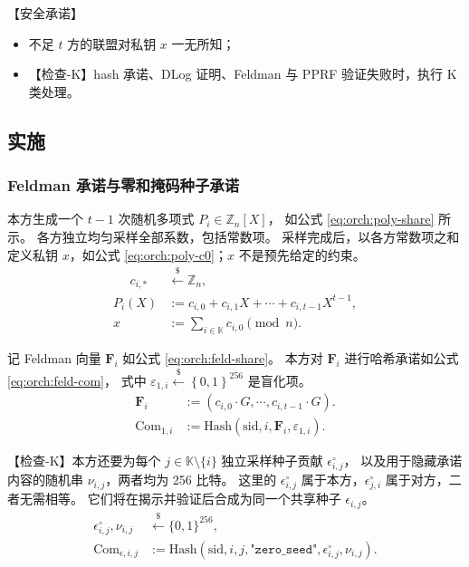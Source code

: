 【安全承诺】

\begin{itemize}
\item
  不足 $t$ 方的联盟对私钥 $x$ 一无所知；
\item
  【检查-K】hash 承诺、DLog 证明、Feldman 与 PPRF 验证失败时，执行 K 类处理。
\end{itemize}

\subsection{实施}

\subsubsection{Feldman 承诺与零和掩码种子承诺}
\label{sec:orchestration:round1}

本方生成一个 $t-1$ 次随机多项式 $P_i \in \mathbb{Z}_n[X]$，
如公式 \eqref{eq:orch:poly-share} 所示。
各方独立均匀采样全部系数，包括常数项。
采样完成后，以各方常数项之和定义私钥 $x$，如公式 \eqref{eq:orch:poly-c0}；$x$ 不是预先给定的约束。
\begin{align}
\tag{coeff}
\phantom{{}={}} c_{i,*} & \stackrel{\$}{\leftarrow} \mathbb{Z}_n, \\
\label{eq:orch:poly-share}\tag{PiX}
P_i(X) &:= c_{i,0} + c_{i,1}X + \cdots + c_{i,t-1}X^{t-1}, \\
\label{eq:orch:poly-c0}\tag{c0}
x &:= \sum_{i\in\mathbb{K}} c_{i,0} \pmod n.
\end{align}

记 Feldman 向量 $\mathbf{F}_i$ 如公式 \eqref{eq:orch:feld-share}。
本方对 $\mathbf{F}_i$ 进行哈希承诺如公式 \eqref{eq:orch:feld-com}，
式中 $\varepsilon_{1,i} \stackrel{\$}{\leftarrow} \left\{0,1\right\}^{256}$ 是盲化项。
\begin{align}
\label{eq:orch:feld-share}\tag{Fi}
\mathbf{F}_i
&:= (c_{i,0} \cdot G, \cdots, c_{i,t-1}\cdot G). \\
\label{eq:orch:feld-com}\tag{Com1}
\mathrm{Com}_{1,i}
&:= \mathrm{Hash}\left(
  \mathrm{sid}, i, \mathbf{F}_i, \varepsilon_{1,i}
\right).
\end{align}

【检查-K】本方还要为每个 $j\in\mathbb{K}\setminus\{i\}$ 独立采样种子贡献 $\epsilon^\circ_{i,j}$，
以及用于隐藏承诺内容的随机串 $\nu_{i,j}$，两者均为 256 比特。
这里的 $\epsilon^\circ_{i,j}$ 属于本方，$\epsilon^\circ_{j,i}$ 属于对方，二者无需相等。
它们将在揭示并验证后合成为同一个共享种子 $\epsilon_{i,j}$。
\begin{align}
  \label{eq:orch:seed-contribution}\tag{seed-contribution}
  \epsilon^\circ_{i,j},\nu_{i,j}
  &\stackrel{\$}{\leftarrow}\{0,1\}^{256}, \\
  \label{eq:orch:seed-com}\tag{seed-com}
  \mathrm{Com}_{\epsilon,i,j}
  &:=\mathrm{Hash}\left(
    \mathrm{sid},i,j,\texttt{"zero\_seed"},\epsilon^\circ_{i,j},\nu_{i,j}
  \right).
\end{align}

